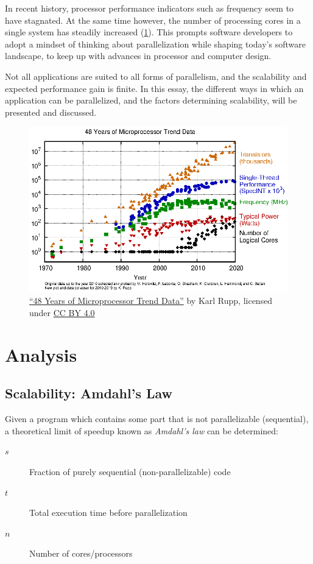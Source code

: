\documentclass[BCOR20mm,DIV14,10pt,headinclude,footexclude,bibtotoc,liststotoc]{article}
\begin{document}
In recent history, processor performance indicators such as frequency seem to
have stagnated. At the same time however, the number of processing cores in a
single system has steadily increased (\cref{fig:processor_trend}). This prompts
software developers to adopt a mindset of thinking about parallelization while
shaping today's software landscape, to keep up with advances in processor and
computer design.

Not all applications are suited to all forms of parallelism, and the scalability
and expected performance gain is finite. In this essay, the different ways in
which an application can be parallelized, and the factors determining
scalability, will be presented and discussed.

\begin{figure}[h]
	\centering
	\includegraphics{images/48-years-processor-trend}
	\caption[48 Years of Microprocessor Trend Data]{
		\href{https://github.com/karlrupp/microprocessor-trend-data}
		{``48 Years of Microprocessor Trend Data''} by Karl Rupp, licensed under
		\href{https://creativecommons.org/licenses/by/4.0/}{CC BY 4.0}}
	\label{fig:processor_trend}
\end{figure}

\section{Analysis}

\subsection{Scalability: Amdahl's Law}

Given a program which contains some part that is not parallelizable
(sequential), a theoretical limit of speedup known as \emph{Amdahl's law}
can be determined:
\begin{description}
	\item[$s$] Fraction of purely sequential (non-parallelizable) code
	\item[$t$] Total execution time before parallelization
	\item[$n$] Number of cores/processors
\end{description}
\end{document}
